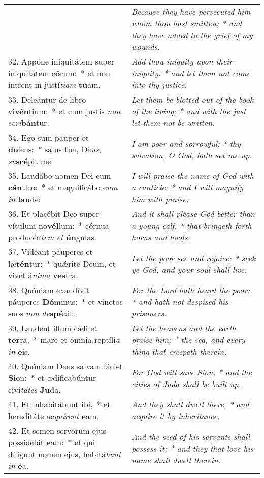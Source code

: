 \begin{longtable}{p{10cm} | p{6cm}}
 & \textit{\small Because they have persecuted him whom thou hast smitten; * and they have added to the grief of my wounds.
}\\
32. Appóne iniquitátem super iniquitátem e\textbf{ó}rum:~* et non intrent in justí\textit{ti}\textit{am} \textbf{tu}am.
 & \textit{\small Add thou iniquity upon their iniquity: * and let them not come into thy justice.
}\\
33. Deleántur de libro vi\textbf{vén}tium:~* et cum justis \textit{non} \textit{scri}\textbf{bán}tur.
 & \textit{\small Let them be blotted out of the book of the living; * and with the just let them not be written.
}\\
34. Ego sum pauper et \textbf{do}lens:~* salus tua, De\textit{us}, \textit{su}\textbf{scé}pit me.
 & \textit{\small I am poor and sorrowful: * thy salvation, O God, hath set me up.
}\\
35. Laudábo nomen Dei cum \textbf{cán}tico:~* et magnificábo e\textit{um} \textit{in} \textbf{lau}de:
 & \textit{\small I will praise the name of God with a canticle: * and I will magnify him with praise.
}\\
36. Et placébit Deo super vítulum no\textbf{vél}lum:~* córnua producén\textit{tem} \textit{et} \textbf{ún}gulas.
 & \textit{\small And it shall please God better than a young calf, * that bringeth forth horns and hoofs.
}\\
37. Vídeant páuperes et læ\textbf{tén}tur:~* qu\'{\ae}rite Deum, et vivet á\textit{ni}\textit{ma} \textbf{ves}tra.
 & \textit{\small Let the poor see and rejoice: * seek ye God, and your soul shall live.
}\\
38. Quóniam exaudívit páuperes \textbf{Dó}minus:~* et vinctos suos \textit{non} \textit{de}\textbf{spé}xit.
 & \textit{\small For the Lord hath heard the poor: * and hath not despised his prisoners.
}\\
39. Laudent illum cæli et \textbf{ter}ra,~* mare et ómnia reptíli\textit{a} \textit{in} \textbf{e}is.
 & \textit{\small Let the heavens and the earth praise him; * the sea, and every thing that creepeth therein.
}\\
40. Quóniam Deus salvam fáciet \textbf{Si}on:~* et ædificabúntur civi\textit{tá}\textit{tes} \textbf{Ju}da.
 & \textit{\small For God will save Sion, * and the cities of Juda shall be built up.
}\\
41. Et inhabitábunt \textbf{i}bi,~* et hereditáte ac\textit{quí}\textit{rent} \textbf{e}am.
 & \textit{\small And they shall dwell there, * and acquire it by inheritance.
}\\
42. Et semen servórum ejus possidébit \textbf{e}am:~* et qui díligunt nomen ejus, habitá\textit{bunt} \textit{in} \textbf{e}a. & \textit{\small And the seed of his servants shall possess it; * and they that love his name shall dwell therein.}\\
\end{longtable}